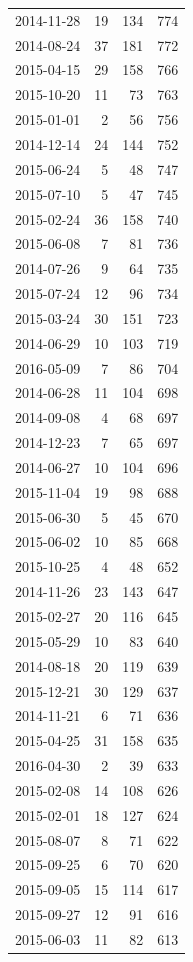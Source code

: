 \begin{tabular}{lrrr}
2014-11-28 & 19 & 134 & 774 \\
2014-08-24 & 37 & 181 & 772 \\
2015-04-15 & 29 & 158 & 766 \\
2015-10-20 & 11 & 73 & 763 \\
2015-01-01 & 2 & 56 & 756 \\
2014-12-14 & 24 & 144 & 752 \\
2015-06-24 & 5 & 48 & 747 \\
2015-07-10 & 5 & 47 & 745 \\
2015-02-24 & 36 & 158 & 740 \\
2015-06-08 & 7 & 81 & 736 \\
2014-07-26 & 9 & 64 & 735 \\
2015-07-24 & 12 & 96 & 734 \\
2015-03-24 & 30 & 151 & 723 \\
2014-06-29 & 10 & 103 & 719 \\
2016-05-09 & 7 & 86 & 704 \\
2014-06-28 & 11 & 104 & 698 \\
2014-09-08 & 4 & 68 & 697 \\
2014-12-23 & 7 & 65 & 697 \\
2014-06-27 & 10 & 104 & 696 \\
2015-11-04 & 19 & 98 & 688 \\
2015-06-30 & 5 & 45 & 670 \\
2015-06-02 & 10 & 85 & 668 \\
2015-10-25 & 4 & 48 & 652 \\
2014-11-26 & 23 & 143 & 647 \\
2015-02-27 & 20 & 116 & 645 \\
2015-05-29 & 10 & 83 & 640 \\
2014-08-18 & 20 & 119 & 639 \\
2015-12-21 & 30 & 129 & 637 \\
2014-11-21 & 6 & 71 & 636 \\
2015-04-25 & 31 & 158 & 635 \\
2016-04-30 & 2 & 39 & 633 \\
2015-02-08 & 14 & 108 & 626 \\
2015-02-01 & 18 & 127 & 624 \\
2015-08-07 & 8 & 71 & 622 \\
2015-09-25 & 6 & 70 & 620 \\
2015-09-05 & 15 & 114 & 617 \\
2015-09-27 & 12 & 91 & 616 \\
2015-06-03 & 11 & 82 & 613 \\

\end{tabular}
